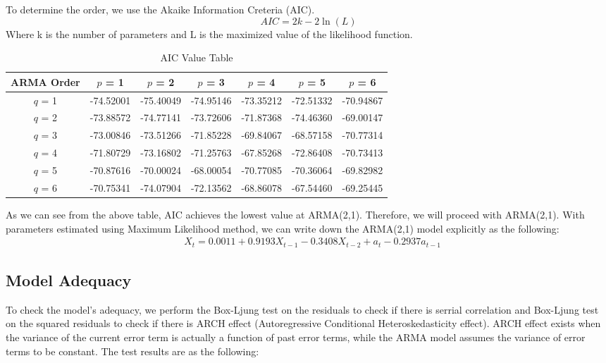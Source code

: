 \documentclass[letterpaper,12pt]{article}
\numberwithin{equation}{section}
\begin{document}
	
	To determine the order, we use the Akaike Information Creteria (AIC).
	\begin{equation}\label{AIC}
	AIC = 2k - 2\ln (L)  
	\end{equation}
	Where k is the number of parameters and L is the maximized value of the likelihood function.
		\begin{table} [!htb] 
			\centering
			\label{AICTable}
			\begin{tabular}{||c|c|c|c|c|c|c||}
				\hline
				ARMA Order&$p$ = 1 & $p$ = 2 & $p$ = 3 & $p$ = 4 & $p$ = 5 & $p$ = 6\\
				\hline
				$q$ = 1 & -74.52001 & -75.40049& -74.95146& -73.35212 &-72.51332 &-70.94867 \\
				$q$ = 2&-73.88572& -74.77141& -73.72606& -71.87368& -74.46360& -69.00147 \\
				$q$ = 3&-73.00846& -73.51266& -71.85228& -69.84067& -68.57158& -70.77314 \\
				$q$ = 4&-71.80729& -73.16802& -71.25763& -67.85268& -72.86408& -70.73413 \\
				$q$ = 5&-70.87616& -70.00024& -68.00054& -70.77085& -70.36064& -69.82982 \\
				$q$ = 6&-70.75341& -74.07904& -72.13562& -68.86078& -67.54460& -69.25445 \\
				\hline
			\end{tabular}
			\caption{AIC Value Table}
		\end{table}
	
	As we can see from the above table, AIC achieves the lowest value at ARMA(2,1). Therefore, we will proceed with ARMA(2,1). With parameters estimated using Maximum Likelihood method, we can write down the ARMA(2,1) model explicitly as the following:  
	\begin{equation}\label{ARMA(2,1)}
	\begin{aligned}
	&X_t = 0.0011 + 0.9193X_{t-1} - 0.3408X_{t-2}+a_t-0.2937a_{t-1}
	\end{aligned}
	\end{equation}
	
	\subsection{Model Adequacy}
	To check the model's adequacy, we perform the Box-Ljung test on the residuals to check if there is serrial correlation and Box-Ljung test on the squared residuals to check if there is ARCH effect (Autoregressive Conditional Heteroskedasticity effect). ARCH effect exists when the variance of the current error term is actually a function of past error terms, while the ARMA model assumes the variance of error terms to be constant. The test results are as the following: 
	
\end{document}
